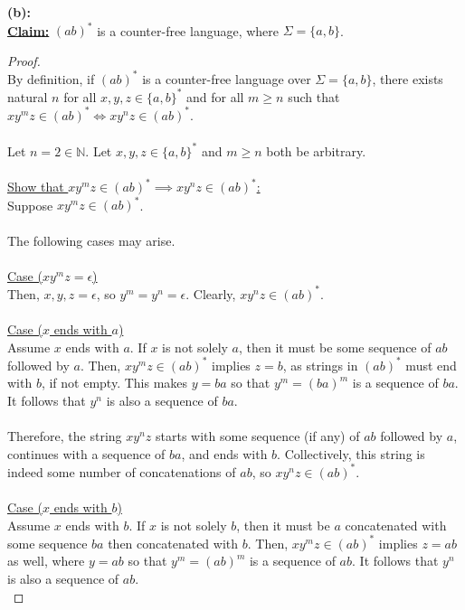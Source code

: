 \documentclass[12pt]{article}
\begin{document}
\textbf{(b):} \\
\textbf{\underline{Claim:}} $(ab)^*$ is a counter-free language, where $\Sigma = \{ a, b \} $. 
\begin{proof}
\leavevmode\\
    By definition, if $(ab)^*$ is a counter-free language over $\Sigma = \{a, b\}$, there exists natural $n$ for all $x, y, z \in \{ a, b \}^*$ and for all $m \geq n$ such that $xy^mz \in (ab)^* \iff xy^nz \in (ab)^*$. \\
    \\
    Let $n = 2 \in \mathbb{N}$. Let $x, y, z \in \{ a, b \}^*$ and $m \geq n$ both be arbitrary. \\
    \\
    \underline{Show that $xy^mz \in (ab)^* \implies xy^nz \in (ab)^*$:} \\
    Suppose $xy^mz \in (ab)^*$. \\
    \\
    The following cases may arise. \\
    \\
    \underline{Case ($xy^mz = \epsilon$)} \\
    Then, $x, y, z = \epsilon$, so $y^m = y^n = \epsilon$. Clearly, $xy^nz \in (ab)^*$. \\
    \\
    \underline{Case ($x$ ends with $a$)} \\
    Assume $x$ ends with $a$. If $x$ is not solely $a$, then it must be some sequence of $ab$ followed by $a$. Then, $xy^mz \in (ab)^*$ implies $z = b$, as strings in $(ab)^*$ must end with $b$, if not empty. This makes $y = ba$ so that $y^m = (ba)^m$ is a sequence of $ba$. It follows that $y^n$ is also a sequence of $ba$. \\
    \\
    Therefore, the string $xy^nz$ starts with some sequence (if any) of $ab$ followed by $a$, continues with a sequence of $ba$, and ends with $b$. Collectively, this string is indeed some number of concatenations of $ab$, so $xy^nz \in (ab)^*$. \\
    \\
    \underline{Case ($x$ ends with $b$)} \\
    Assume $x$ ends with $b$. If $x$ is not solely $b$, then it must be $a$ concatenated with some sequence $ba$ then concatenated with $b$. Then, $xy^mz \in (ab)^*$ implies $z = ab$ as well, where $y = ab$ so that $y^m = (ab)^m$ is a sequence of $ab$. It follows that $y^n$ is also a sequence of $ab$. \\

\end{proof}
\end{document}

